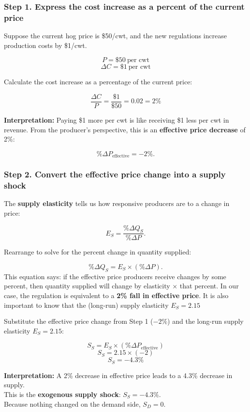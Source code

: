 \documentclass[
  letterpaper,
  DIV=11,
  numbers=noendperiod]{scrartcl}
\begin{document}
\subsubsection{Step 1. Express the cost increase as a percent of the
current
price}\label{step-1.-express-the-cost-increase-as-a-percent-of-the-current-price}

Suppose the current hog price is \$50/cwt, and the new regulations
increase production costs by \$1/cwt.

\[
P = \$50 \ \text{per cwt} 
\] \[
\Delta C = \$1 \ \text{per cwt}
\]

Calculate the cost increase as a percentage of the current price:

\[
\frac{\Delta C}{P} = \frac{\$1}{\$50} = 0.02 = 2\%
\]

\textbf{Interpretation:} Paying \$1 more per cwt is like receiving \$1
less per cwt in revenue. From the producer's perspective, this is an
\textbf{effective price decrease} of 2\%:

\[
\% \Delta P_{\text{effective}} = -2\%.
\]

\subsubsection{Step 2. Convert the effective price change into a supply
shock}\label{step-2.-convert-the-effective-price-change-into-a-supply-shock}

The \textbf{supply elasticity} tells us how responsive producers are to
a change in price:

\[
E_S = \frac{\% \Delta Q_S}{\% \Delta P}.
\]

Rearrange to solve for the percent change in quantity supplied:

\[
\% \Delta Q_S = E_S \times (\% \Delta P).
\] This equation says: if the effective price producers receive changes
by some percent, then quantity supplied will change by elasticity × that
percent. In our case, the regulation is equivalent to a \textbf{2\% fall
in effective price}. It is also important to know that the (long-run)
supply elasticity \(E_S = 2.15\)

\newpage

Substitute the effective price change from Step 1 (\(-2\%\)) and the
long-run supply elasticity \(E_S = 2.15\):

\[
S_S = E_S \times (\% \Delta P_{\text{effective}})
\] \[
S_S = 2.15 \times (-2)
\] \[
S_S = -4.3\%
\]

\textbf{Interpretation:} A 2\% decrease in effective price leads to a
4.3\% decrease in supply.\\
This is the \textbf{exogenous supply shock}: \(S_S = -4.3\%\).\\
Because nothing changed on the demand side, \(S_D = 0\).
\end{document}
